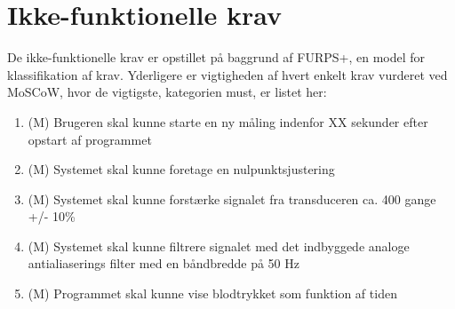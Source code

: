 \section{Ikke-funktionelle krav}
De ikke-funktionelle krav er opstillet på baggrund af FURPS+, en model for klassifikation af krav. Yderligere er vigtigheden af hvert enkelt krav vurderet ved MoSCoW, hvor de vigtigste, kategorien must, er listet her:

\begin{enumerate}
	\item (M) Brugeren skal kunne starte en ny måling indenfor XX sekunder efter opstart af programmet 
	\item (M) Systemet skal kunne foretage en nulpunktsjustering
	\item (M) Systemet skal kunne forstærke signalet fra transduceren ca. 400 gange +/- 10\%
	\item (M) Systemet skal kunne filtrere signalet med det indbyggede analoge antialiaserings filter med en båndbredde på 50 Hz 
	\item (M) Programmet skal kunne vise blodtrykket som funktion af tiden
\end{enumerate}



